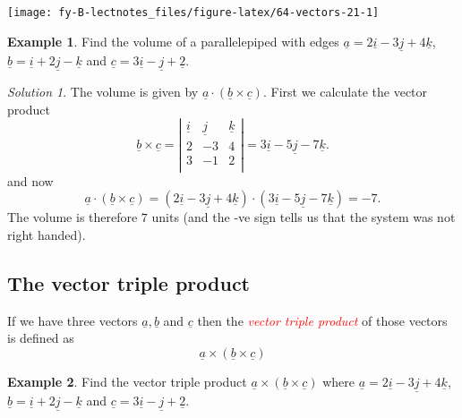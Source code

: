 \documentclass[
  11pt,
  oneside]{book}
\newcommand{\slide}{}
\theoremstyle{definition}
\theoremstyle{definition}
\newtheorem{example}{Example}[chapter]
\theoremstyle{definition}
\theoremstyle{definition}
\theoremstyle{remark}
\newtheorem*{solution}{Solution}
\begin{document}
\begin{center}\texttt{[image: fy-B-lectnotes\_files/figure-latex/64-vectors-21-1]} \end{center}

\slide

\begin{example}
Find the volume of a parallelepiped with edges \(\underline a = 2\underline i - 3\underline j + 4\underline k\), \(\underline b = \underline i + 2\underline j - \underline k\) and \(\underline c = 3\underline i - \underline j + \underline 2\).
\end{example}

\begin{solution}
The volume is given by \(\underline a \cdot(\underline b\times\underline c)\). First we calculate the vector product
\[
\underline b \times\underline c = \left|\begin{array}{ccc}\underline i&\underline j&\underline k\\2&-3&4\\3&-1&2\\\end{array}\right| = 3\underline i-5\underline j-7\underline k.
\]
and now
\[
\underline a \cdot(\underline b\times\underline c) = (2\underline i - 3\underline j + 4\underline k)\cdot(3\underline i-5\underline j-7\underline k) = -7.
\]
The volume is therefore \(7\) units (and the -ve sign tells us that the system was not right handed).
\end{solution}

\slide

\subsection{The vector triple product}\label{the-vector-triple-product}

If we have three vectors \(\underline a, \underline b\) and \(\underline c\) then the \textcolor{red}{\em vector triple product} of those vectors is defined as
\[
\underline a \times (\underline b \times\underline c)
\]

\begin{example}
Find the vector triple product \(\underline a \times (\underline b \times\underline c)\) where \(\underline a = 2\underline i - 3\underline j + 4\underline k\), \(\underline b = \underline i + 2\underline j - \underline k\) and \(\underline c = 3\underline i - \underline j + \underline 2\).
\end{example}
\end{document}
